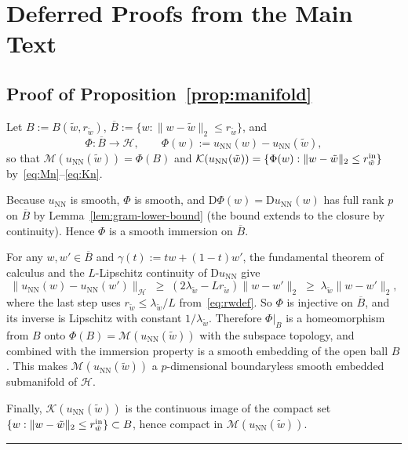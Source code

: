 \documentclass[twoside,11pt]{article}
\newcommand{\BlackBoxProof}{\rule{1.5ex}{1.5ex}}
\renewenvironment{proof}{\par\noindent{\bf Proof\ }}{\hfill\BlackBoxProof\par\medskip}
\newcommand{\D}{\mathrm{D}}
\newcommand{\NN}{\mathrm{NN}}
\newcommand{\calH}{\mathcal{H}}
\newcommand{\calK}{\mathcal{K}}
\newcommand{\calM}{\mathcal{M}}
\begin{document}

\newpage
\appendix
\section{Deferred Proofs from the Main Text}\label{app:deferred-proofs}
\subsection{Proof of Proposition~\ref{prop:manifold}}\label{app:proof-manifold}
\begin{proof}
Let $B := B(\tilde w, r_{\tilde w})$, $\overline B := \{w:\|w-\tilde w\|_2\le r_{\tilde w}\}$, and
\[
\Phi:\overline B \to \mathcal{H}, \qquad \Phi(w) := u_\NN(w) - u_\NN(\tilde w),
\]
so that $\calM(u_\NN(\tilde w)) = \Phi(B)$ and $\calK(u_\NN(\tilde w)) = \{\Phi(w) : \|w-\tilde w\|_2 \le r^{\rm in}_{\tilde w}\}$ by~\eqref{eq:Mn}--\eqref{eq:Kn}.

Because $u_\NN$ is smooth, $\Phi$ is smooth, and $\D\Phi(w) = \D u_\NN(w)$ has full rank $p$ on $\overline B$ by Lemma~\ref{lem:gram-lower-bound} (the bound extends to the closure by continuity). Hence $\Phi$ is a smooth immersion on $\overline B$.

For any $w,w'\in\overline B$ and $\gamma(t) := tw + (1-t)w'$, the fundamental theorem of calculus and the $L$-Lipschitz continuity of $\D u_\NN$ give
\begin{equation}\label{eq:bi-lip-lower}
\|u_\NN(w)-u_\NN(w')\|_\calH \;\ge\; (2\lambda_{\tilde w} - L r_{\tilde w})\|w-w'\|_2 \;\ge\; \lambda_{\tilde w}\|w-w'\|_2,
\end{equation}
where the last step uses $r_{\tilde w}\le \lambda_{\tilde w}/L$ from~\eqref{eq:rwdef}. So $\Phi$ is injective on $\overline B$, and its inverse is Lipschitz with constant $1/\lambda_{\tilde w}$. Therefore $\Phi|_B$ is a homeomorphism from $B$ onto $\Phi(B) = \calM(u_\NN(\tilde w))$ with the subspace topology, and combined with the immersion property is a smooth embedding of the open ball $B$ \citep[Prop.~5.30]{Lee2003}. This makes $\calM(u_\NN(\tilde w))$ a $p$-dimensional boundaryless smooth embedded submanifold of $\calH$.

Finally, $\calK(u_\NN(\tilde w))$ is the continuous image of the compact set $\{w : \|w-\tilde w\|_2 \le r^{\rm in}_{\tilde w}\}\subset B$, hence compact in $\calM(u_\NN(\tilde w))$.
\end{proof}
\end{document}
